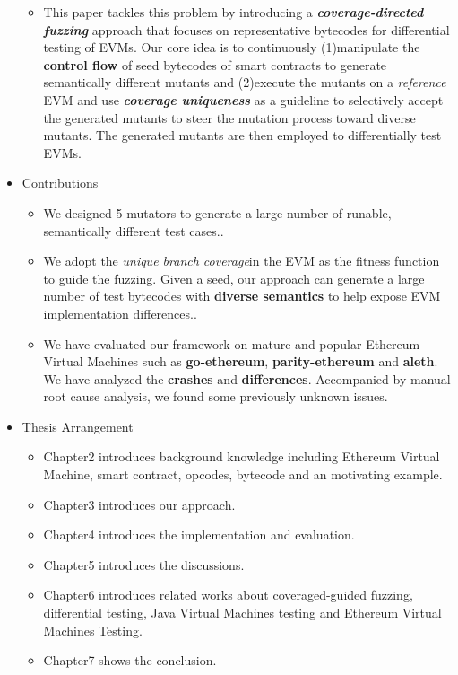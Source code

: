 \documentclass[a4paper]{article}
\begin{document}
\begin{itemize}
\begin{itemize}
			\item This paper tackles this problem by introducing a \textit{\textbf{coverage-directed fuzzing}} approach that focuses on representative bytecodes for differential testing of EVMs. Our core idea is to continuously (1)manipulate the \textbf{control flow} of seed bytecodes of smart contracts to generate semantically different mutants and (2)execute the mutants on a \textit{reference} EVM and use \textit{\textbf{coverage uniqueness}} as a guideline to selectively accept the generated mutants to steer the mutation process toward diverse mutants. The generated mutants are then employed to differentially test EVMs.
		\end{itemize}
		\item Contributions
		\begin{itemize}
			\item We designed 5 mutators to generate a large number of runable, semantically different test cases..
			\item We adopt the \textit{unique branch coverage}in the EVM as the fitness function to guide the fuzzing. Given a seed, our approach can generate a large number of test bytecodes with \textbf{diverse semantics} to help expose EVM implementation differences..
			\item We have evaluated our framework on mature and popular Ethereum Virtual Machines such as \textbf{go-ethereum}, \textbf{parity-ethereum} and \textbf{aleth}. We have analyzed the \textbf{crashes} and \textbf{differences}. Accompanied by manual root cause analysis, we found some previously unknown issues.
		\end{itemize}
		\item Thesis Arrangement
		\begin{itemize}
			\item Chapter2 introduces background knowledge  including Ethereum Virtual Machine, smart contract, opcodes, bytecode and an motivating example. 
			\item Chapter3 introduces our approach.
			\item Chapter4 introduces the implementation and evaluation.
			\item Chapter5 introduces the discussions.
			\item Chapter6 introduces related works about coveraged-guided fuzzing, differential testing, Java Virtual Machines testing and Ethereum Virtual Machines Testing.
			\item Chapter7 shows the conclusion.
		\end{itemize}
	\end{itemize}
	
\end{document}
